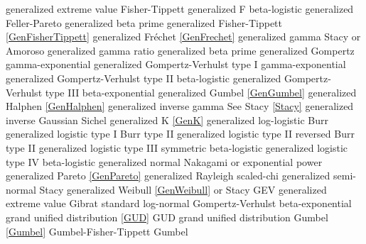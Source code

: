 generalized extreme value		\dotfill	Fisher-Tippett						\ncite	%
generalized F					\dotfill	beta-logistic 						\ncite	%
generalized Feller-Pareto			\dotfill	generalized beta prime				
generalized Fisher-Tippett			\dotfill	\eqref{GenFisherTippett} 				\ncite	%
generalized Fr\'{e}chet 			\dotfill	\eqref{GenFrechet} 					\ncite	%
generalized gamma 				\dotfill	Stacy or Amoroso 					\ncite	%
generalized gamma ratio			\dotfill	generalized beta prime				 	%
generalized Gompertz			\dotfill	gamma-exponential					
generalized Gompertz-Verhulst type I \dotfill	gamma-exponential					    	%
generalized Gompertz-Verhulst type II \dotfill	beta-logistic  						    	%
generalized Gompertz-Verhulst type III \dotfill	beta-exponential 					   		%
generalized Gumbel				\dotfill	\eqref{GenGumbel}					\ncite	%
generalized Halphen				\dotfill	\eqref{GenHalphen}					\ncite
generalized inverse gamma 		\dotfill	See Stacy \eqref{Stacy} 				\ncite	%
generalized inverse Gaussian		\dotfill	Sichel							\ncite
generalized K					\dotfill	\eqref{GenK}						\mcite{\self} 
generalized log-logistic			\dotfill	Burr 								\ncite	%
generalized logistic type I			\dotfill	Burr type II 						\ncite	%
generalized logistic type II			\dotfill	reversed Burr type II 					\ncite	%
generalized logistic type III		\dotfill	symmetric beta-logistic  				\ncite	%
generalized logistic type IV		\dotfill	beta-logistic 						   		%
generalized normal	 			\dotfill	Nakagami or exponential power		\ncite	%
generalized Pareto				\dotfill	\eqref{GenPareto}					\ncite	%
generalized Rayleigh	 			\dotfill	scaled-chi							\ncite	%
generalized semi-normal			\dotfill	Stacy 							   	%
generalized Weibull				\dotfill	\eqref{GenWeibull} or Stacy			\ncite	%
GEV 						\dotfill	generalized extreme value 			\ncite	%
Gibrat						\dotfill	standard log-normal 					\ncite 	%
Gompertz-Verhulst				\dotfill	beta-exponential 					    	%
grand unified distribution			\dotfill	\eqref{GUD}						\mcite{\self}	%
GUD							\dotfill	grand unified distribution				\mcite{\self}	%
Gumbel 						\dotfill	\eqref{Gumbel} 						\ncite	%
Gumbel-Fisher-Tippett			\dotfill	Gumbel 							\ncite 	%
